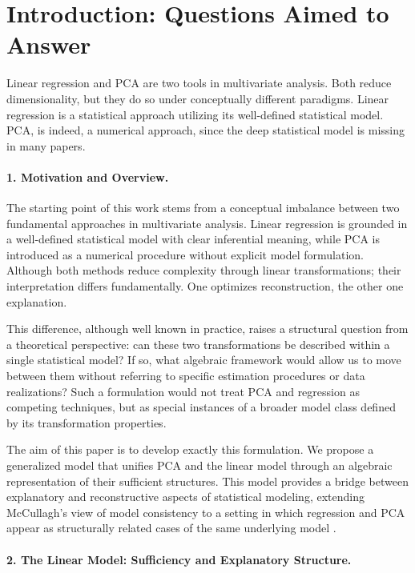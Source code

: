 \section{Introduction: Questions Aimed to Answer}

Linear regression and PCA are two tools in multivariate analysis. Both reduce dimensionality, but they do so under conceptually different paradigms. Linear regression is a statistical approach utilizing its well-defined statistical model. PCA, is indeed, a numerical approach, since the deep statistical model is missing in many papers.

\paragraph{1. Motivation and Overview.} 

The starting point of this work stems from a conceptual imbalance between two fundamental approaches in multivariate analysis. Linear regression is grounded in a well-defined statistical model with clear inferential meaning, while PCA is introduced as a numerical procedure without explicit model formulation. Although both methods reduce complexity through linear transformations; their interpretation differs fundamentally. One optimizes reconstruction, the other one explanation.

This difference, although well known in practice, raises a structural question from a theoretical perspective:
can these two transformations be described within a single statistical model? If so, what algebraic framework would allow us to move between them without referring to specific estimation procedures or data realizations? Such a formulation would not treat PCA and regression as competing techniques, but as special instances of a broader model class defined by its transformation properties.

The aim of this paper is to develop exactly this formulation.
We propose a generalized model that unifies PCA and the linear model through an algebraic representation of their sufficient structures. This model provides a bridge between explanatory and reconstructive aspects of statistical modeling, extending McCullagh’s view of model consistency to a setting in which regression and PCA appear as structurally related cases of the same underlying model \cite{mccullagh}.

\paragraph{2. The Linear Model: Sufficiency and Explanatory Structure.}

